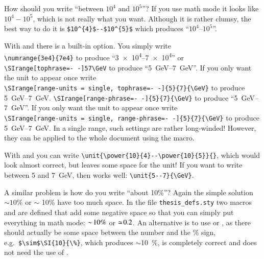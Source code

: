 How should you write \enquote{between $10^{4}$ and $10^{5}$}?
If you use math mode it looks like $10^{4} - 10^{5}$, which is not
really what you want. Although it is rather clumsy, the best way to do
it is \verb+$10^{4}$--$10^{5}$+ which produces
\enquote{$10^{4}$--$10^{5}$}.

With  and  there
is a built-in option. You simply write\\
\verb+\numrange{3e4}{7e4}+
to produce \enquote{\numrange{3e4}{7e4}} or\\
 {%
  \texttt{\textbackslash SIrange[tophrase=-\,-]{5}{7}{\textbackslash GeV}}
  to produce \enquote{\SIrange[tophrase=--]{5}{7}{\GeV}}.
  If you only want the unit to appear once write\\
  \texttt{\textbackslash SIrange[range-units = single, tophrase=-\,-]\{5\}\{7\}\{\textbackslash GeV\}}
  to produce
  \SIrange[trapambigrange=false, tophrase=--]{5}{7}{\GeV}.
}{%
  \texttt{\textbackslash SIrange[range-phrase=-\,-]\{5\}\{7\}\{\textbackslash GeV\}}
  to produce \enquote{\SIrange[range-phrase=--]{5}{7}{\GeV}}.
  If you only want the unit to appear once write\\
  \texttt{\textbackslash SIrange[range-units = single, range-phrase=-\,-]\{5\}\{7\}\{\textbackslash GeV\}}
  to produce
  \SIrange[range-units = single, range-phrase=--]{5}{7}{\GeV}.
}
In a single range, such settings are rather long-winded!
However, they can be applied to the whole
document using the  macro.

With  and  you can write
\verb+\unit{\power{10}{4}--\power{10}{5}}{}+, which would look almost
correct, but leaves some space for the unit! If you want to write
between 5 and \SI{7}{\GeV}, then  works well:
\verb+\unit{5--7}{\GeV}+.

A similar problem is how do you write \enquote{about 10\%}?  Again the
simple solution $\sim 10\%$ or $\sim$ 10\% have too much space. In the
file \texttt{thesis\_defs.sty} two macros  and
 are defined that add some negative space so that you
can simply put everything in math mode: $\sim\! 10\%$ or $\simeq\!
0.2$. An alternative is to use  or , as there
should actually be some space between the number and the \% sign,
e.g.\ \verb+$\sim$\SI{10}{\%}+, which produces $\sim$\SI{10}{\%}, is
completely correct and does not need the use of .

